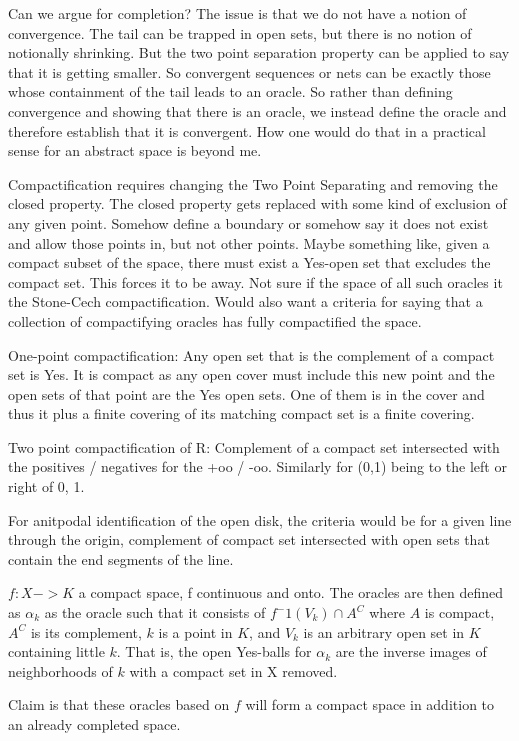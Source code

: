 \documentclass[12pt]{article}
\begin{document}
Can we argue for completion? The issue is that we do not have a notion of convergence. The tail can be trapped in open sets, but there is no notion of notionally shrinking. But the two point separation property can be applied to say that it is getting smaller. So convergent sequences or nets can be exactly those whose containment of the tail leads to an oracle. So rather than defining convergence and showing that there is an oracle, we instead define the oracle and therefore establish that it is convergent. How one would do that in a practical sense for an abstract space is beyond me. 

Compactification requires changing the Two Point Separating and removing the closed property. The closed property gets replaced with some kind of exclusion of any given point. Somehow define a boundary or somehow say it does not exist and allow those points in, but not other points. Maybe something like, given a compact subset of the space, there must exist a Yes-open set that excludes the compact set. This forces it to be away. Not sure if the space of all such oracles it the Stone-Cech compactification. Would also want a criteria for saying that a collection of compactifying oracles has fully compactified the space. 

One-point compactification: Any open set that is the complement of a compact set is Yes. It is compact as any open cover must include this new point and the open sets of that point are the Yes open sets. One of them is in the cover and thus it plus a finite covering of its matching compact set is a finite covering. 

Two point compactification of R: Complement of a compact set intersected with the positives / negatives for the +oo / -oo.  Similarly for (0,1) being to the left or right of 0, 1. 

For anitpodal identification of the open disk, the criteria would be for a given line through the origin, complement of compact set intersected with open sets that contain the end segments of the line. 

$f: X -> K$ a compact space, f continuous and onto. The oracles are then defined as $\alpha_k$ as the oracle such that it consists of $f^-1(V_k) \cap A^C$ where $A$ is compact, $A^C$ is its complement, $k$ is a point in $K$, and $V_k$ is an arbitrary open set in $K$ containing little $k$. That is, the open Yes-balls for $\alpha_k$ are the inverse images of neighborhoods of $k$ with a compact set in X removed. 

Claim is that these oracles based on $f$ will form a compact space in addition to an already completed space. 
\end{document}
